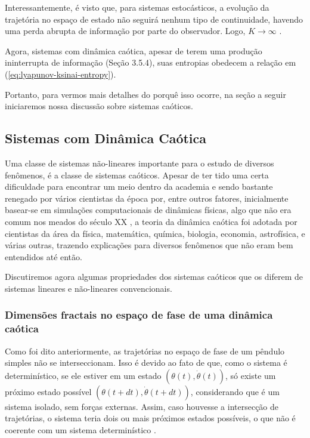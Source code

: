 \documentclass[a4paper, 12pt]{article}
\begin{document}
Interessantemente, é visto que, para sistemas estocásticos, a evolução da trajetória no espaço de estado não seguirá nenhum tipo de continuidade, havendo uma perda abrupta de informação por parte do observador. Logo, $K \rightarrow \infty$ \cite{attux2001dinamica}.

Agora, sistemas com dinâmica caótica, apesar de terem uma produção ininterrupta de informação (Seção 3.5.4), suas entropias obedecem a relação em (\ref{eq:lyapunov-ksinai-entropy}). 

Portanto, para vermos mais detalhes do porquê isso ocorre, na seção a seguir iniciaremos nossa discussão sobre sistemas caóticos.

\subsection{Sistemas com Dinâmica Caótica}
Uma classe de sistemas não-lineares importante para o estudo de diversos fenômenos, é a classe de sistemas caóticos. Apesar de ter tido uma certa dificuldade para encontrar um meio dentro da academia e sendo bastante renegado por vários cientistas da época por, entre outros fatores, inicialmente basear-se em simulações  computacionais de dinâmicas físicas, algo que não era comum nos meados do século XX \cite{gleick2008chaos}, a teoria da dinâmica caótica foi adotada por cientistas da área da física, matemática, química, biologia, economia, astrofísica, e várias outras, trazendo explicações para diversos fenômenos que não eram bem entendidos até então.

Discutiremos agora algumas propriedades dos sistemas caóticos que os diferem de sistemas lineares e não-lineares convencionais.

\subsubsection{Dimensões fractais no espaço de fase de uma dinâmica caótica}

Como foi dito anteriormente, as trajetórias no espaço de fase de um pêndulo simples não se interseccionam. Isso é devido ao fato de que, como o sistema é determinístico, se ele estiver em um estado $(\theta(t), \dot{\theta}(t))$, só existe um próximo estado possível $(\theta(t + dt), \dot{\theta}(t + dt))$, considerando que é um sistema isolado, sem forças externas. Assim, caso houvesse a intersecção de trajetórias, o sistema teria dois ou mais próximos estados possíveis, o que não é coerente com um sistema determinístico \cite{fiedler1994caos}.
\end{document}
